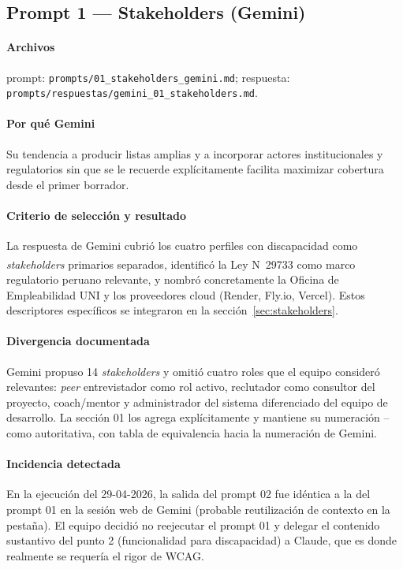 \subsection{Prompt 1 --- Stakeholders (Gemini)}
\paragraph{Archivos} prompt: \texttt{prompts/01\_stakeholders\_gemini.md};
respuesta: \texttt{prompts/respuestas/gemini\_01\_stakeholders.md}.

\paragraph{Por qué Gemini} Su tendencia a producir listas amplias y a
incorporar actores institucionales y regulatorios sin que se le
recuerde explícitamente facilita maximizar cobertura desde el primer
borrador.

\paragraph{Criterio de selección y resultado} La respuesta de Gemini
cubrió los cuatro perfiles con discapacidad como \textit{stakeholders}
primarios separados, identificó la Ley
N\textsuperscript{\textordmasculine}~29733 como marco regulatorio peruano
relevante, y nombró concretamente la Oficina de Empleabilidad UNI y
los proveedores cloud (Render, Fly.io, Vercel). Estos descriptores
específicos se integraron en la sección~\ref{sec:stakeholders}.

\paragraph{Divergencia documentada} Gemini propuso 14
\textit{stakeholders} y omitió cuatro roles que el equipo consideró
relevantes: \textit{peer} entrevistador como rol activo, reclutador
como consultor del proyecto, coach/mentor y administrador del sistema
diferenciado del equipo de desarrollo. La sección 01 los agrega
explícitamente y mantiene su numeración -- como
autoritativa, con tabla de equivalencia hacia la numeración de Gemini.

\paragraph{Incidencia detectada} En la ejecución del 29-04-2026, la
salida del prompt 02 fue idéntica a la del prompt 01 en la sesión web
de Gemini (probable reutilización de contexto en la pestaña). El
equipo decidió no reejecutar el prompt 01 y delegar el contenido
sustantivo del punto 2 (funcionalidad para discapacidad) a Claude, que
es donde realmente se requería el rigor de WCAG.

